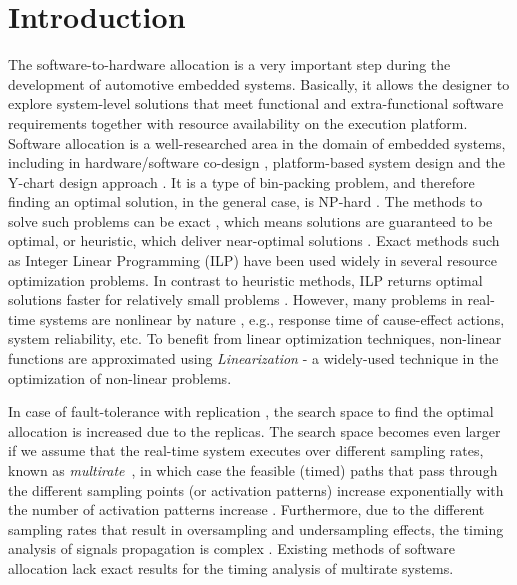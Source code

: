 \section{Introduction}
The software-to-hardware allocation is a very important step during the development of automotive embedded systems. Basically, it allows the designer to explore system-level solutions that meet functional and extra-functional software requirements together with resource availability on the execution platform. Software allocation is a well-researched area in the domain of embedded systems, including in hardware/software co-design \cite{Wolf2003ACodesign}, platform-based system design \cite{Sangiovanni-Vincentelli2004BenefitsDesign} and the Y-chart design approach \cite{ychart_Kienhuis2002}. It is a type of bin-packing problem, and therefore finding an optimal solution, in the general case, is  NP-hard \cite{Fernandez-Baca1989AllocatingSystem}. The methods to solve such problems can be exact \cite{Saidi2015AnArchitectures}, which means solutions are guaranteed to be optimal, or heuristic, which deliver near-optimal solutions \cite{faragardi2018AECUs}\cite{Bucaioni2018MoVES:Systems}. Exact methods such as Integer Linear Programming (ILP) \cite{Bradley1977AppliedProgramming} have been used widely in several resource optimization problems. In contrast to heuristic methods, ILP returns optimal solutions faster for relatively small problems \cite{Wozniak2013AnArchitectures}. However, many problems in real-time systems are nonlinear by nature \cite{Fernandez2014SystemApproach}, e.g., response time of cause-effect actions, system reliability, etc. To benefit from linear optimization techniques, non-linear functions are approximated using \textit{Linearization} - a widely-used technique in the optimization of non-linear problems.

In case of fault-tolerance with replication \cite{Kopetz1989DistributedApproach}, the search space to find the optimal allocation is increased due to the replicas. The search space becomes even larger if we assume that the real-time system executes over different sampling rates, known as \textit{multirate}~\cite{Vinet2010APolynomials}, in which case the feasible (timed) paths that pass through the different sampling points (or activation patterns) increase exponentially with the number of activation patterns increase . Furthermore, due to the different sampling rates that result in oversampling and undersampling effects, the timing analysis of signals propagation is complex \cite{mubeen2013support}. Existing methods of software allocation lack exact results for the timing analysis of multirate systems.

